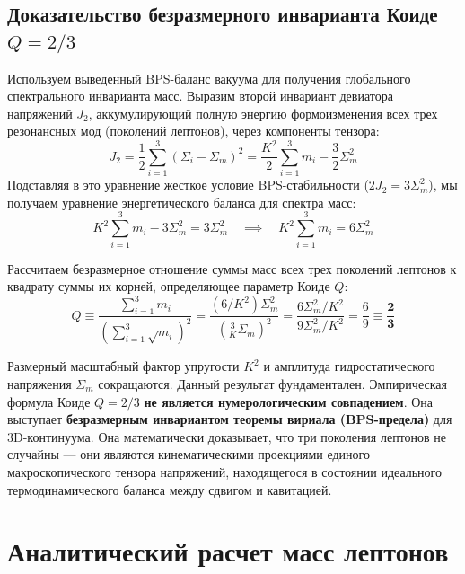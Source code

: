 \documentclass[12pt,a4paper]{article}
\begin{document}
	\subsection{Доказательство безразмерного инварианта Коиде $Q = 2/3$}
	Используем выведенный BPS-баланс вакуума для получения глобального спектрального инварианта масс. Выразим второй инвариант девиатора напряжений $J_2$, аккумулирующий полную энергию формоизменения всех трех резонансных мод (поколений лептонов), через компоненты тензора:
	\begin{equation}
		J_2 = \frac{1}{2} \sum_{i=1}^3 (\Sigma_i - \Sigma_m)^2 = \frac{K^2}{2} \sum_{i=1}^3 m_i - \frac{3}{2} \Sigma_m^2
	\end{equation}
	Подставляя в это уравнение жесткое условие BPS-стабильности ($2 J_2 = 3 \Sigma_m^2$), мы получаем уравнение энергетического баланса для спектра масс:
	\begin{equation}
		K^2 \sum_{i=1}^3 m_i - 3 \Sigma_m^2 = 3 \Sigma_m^2 \quad \implies \quad K^2 \sum_{i=1}^3 m_i = 6 \Sigma_m^2
	\end{equation}
	
	Рассчитаем безразмерное отношение суммы масс всех трех поколений лептонов к квадрату суммы их корней, определяющее параметр Коиде $Q$:
	\begin{equation}
		Q \equiv \frac{\sum_{i=1}^3 m_i}{\left( \sum_{i=1}^3 \sqrt{m_i} \right)^2} = \frac{(6 / K^2) \Sigma_m^2}{\left( \frac{3}{K} \Sigma_m \right)^2} = \frac{6 \Sigma_m^2 / K^2}{9 \Sigma_m^2 / K^2} = \frac{6}{9} \equiv \mathbf{\frac{2}{3}}
	\end{equation}
	
	Размерный масштабный фактор упругости $K^2$ и амплитуда гидростатического напряжения $\Sigma_m$ сокращаются. Данный результат фундаментален. Эмпирическая формула Коиде $Q = 2/3$ \textbf{не является нумерологическим совпадением}. Она выступает \textbf{безразмерным инвариантом теоремы вириала (BPS-предела)} для 3D-континуума. 
	Она математически доказывает, что три поколения лептонов не случайны — они являются кинематическими проекциями единого макроскопического тензора напряжений, находящегося в состоянии идеального термодинамического баланса между сдвигом и кавитацией.
			
	\section{Аналитический расчет масс лептонов}
	
\end{document}

